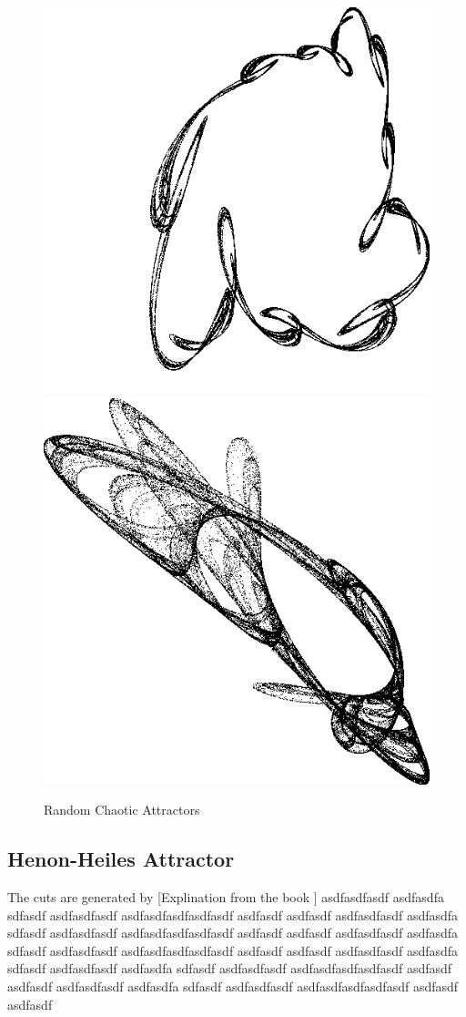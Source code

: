\documentclass[12pt]{article}
\begin{document}
\begin{figure}[H]
    \includegraphics[width=0.47\linewidth]{Figures/random_attractors/862.png}
    \includegraphics[width=0.47\linewidth]{Figures/random_attractors/54966.png}
    \caption{Random Chaotic Attractors}
    \label{fig:random chaotic attractors2}
\end{figure}



\newpage

\subsection{Henon-Heiles Attractor}
The cuts are generated by [Explination from the book \cite{Numerical}] asdfasdfasdf asdfasdfa sdfasdf asdfasdfasdf asdfasdfasdfasdfasdf asdfasdf asdfasdf asdfasdfasdf asdfasdfa sdfasdf asdfasdfasdf asdfasdfasdfasdfasdf asdfasdf asdfasdf asdfasdfasdf asdfasdfa sdfasdf asdfasdfasdf asdfasdfasdfasdfasdf asdfasdf asdfasdf asdfasdfasdf asdfasdfa sdfasdf asdfasdfasdf asdfasdfa sdfasdf asdfasdfasdf asdfasdfasdfasdfasdf asdfasdf asdfasdf asdfasdfasdf asdfasdfa sdfasdf asdfasdfasdf asdfasdfasdfasdfasdf asdfasdf asdfasdf
\end{document}

